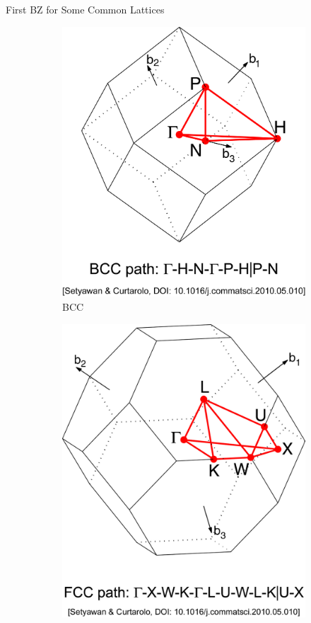 \documentclass[aspectratio=169]{beamer}
\begin{document}
\begin{frame}{First BZ for Some Common Lattices}
\begin{figure}
\begin{subfigure}{0.24\textwidth}
                \includegraphics[width=\linewidth]{lectures/figures/7_Brillouin_Zone_BCC.png}
                \caption{BCC}
            \end{subfigure}
            \begin{subfigure}{0.24\textwidth}
                \includegraphics[width=\linewidth]{lectures/figures/7_Brillouin_Zone_FCC.png}

\end{subfigure}
\end{figure}
\end{frame}
\end{document}

